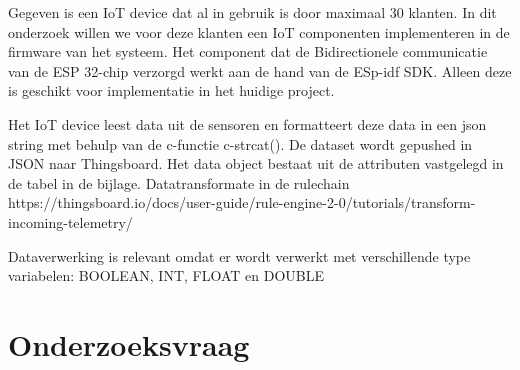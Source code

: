 Gegeven is een IoT device dat al in gebruik is door maximaal 30 klanten. In dit onderzoek willen we voor deze klanten een IoT componenten implementeren in de firmware van het systeem. Het component dat de Bidirectionele communicatie van de ESP 32-chip verzorgd werkt aan de hand van de ESp-idf SDK. Alleen deze is geschikt voor implementatie in het huidige project.   



Het IoT device leest data uit de sensoren en formatteert deze data in een json string met behulp van de c-functie c-strcat(). De dataset wordt gepushed in JSON naar Thingsboard. Het data object bestaat uit de attributen vastgelegd in de tabel in de bijlage.
Datatransformate in de rulechain
https://thingsboard.io/docs/user-guide/rule-engine-2-0/tutorials/transform-incoming-telemetry/ 


Dataverwerking is relevant omdat er wordt verwerkt met verschillende type variabelen: BOOLEAN, INT, FLOAT en DOUBLE



\section{Onderzoeksvraag}


